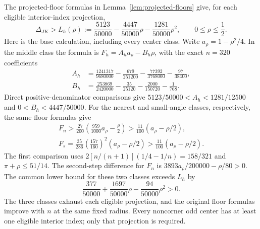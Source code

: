 The projected-floor formulas in Lemma~\ref{lem:projected-floors} give,
for each eligible interior-index projection,
\begin{equation}
 \Delta_{JK}>L_h(\rho):=
 \frac{5123}{50000}-\frac{4447}{50000}\rho
                         -\frac{1281}{50000}\rho^2,
 \qquad 0\leq\rho\leq\frac12.                      \label{eq:argmax-half-floor}
\end{equation}
Here is the base calculation, including every center class.  Write
$a_\rho=1-\rho^2/4$.  In the middle class the formula is
$F_h=A_h a_\rho-B_h\rho$, with the exact $n=320$ coefficients
\begin{align*}
 A_h&=\frac{1241317}{9680000}-\frac{679}{251200}
                    -\frac{77392}{3768000}-\frac{97}{38400},\\
 B_h&=\frac{253869}{2420000}-\frac{35}{25120}
                    -\frac{2000}{150720}-\frac1{768}.
\end{align*}
Direct positive-denominator comparisons give
$5123/50000<A_h<1281/12500$ and $0<B_h<4447/50000$.
For the nearest and small-angle classes, respectively, the same floor
formulas give
\begin{gather*}
 F_n>\frac{27}{200}\left(\frac{959}{1000}a_\rho-\frac\rho2\right)
       >\frac{11}{100}(a_\rho-\rho/2),\\
 F_s=\frac{35}{286}\left(\frac{157}{160}\right)^2(a_\rho-\rho/2)
       >\frac{11}{100}(a_\rho-\rho/2).
\end{gather*}
The first comparison uses
$2[n/(n+1)](1/4-1/n)=158/321$ and
$\pi+\rho\leq51/14$.  The second-step difference for $F_n$ is
$3893a_\rho/200000-\rho/80>0$.  The common lower bound for these
two classes exceeds $L_h$ by
\[
 \frac{377}{50000}+\frac{1697}{50000}\rho
                                    -\frac{94}{50000}\rho^2>0.
\]
The three classes exhaust each eligible projection, and the original
floor formulas improve with $n$ at the same fixed radius.  Every
noncorner odd center has at least one eligible interior index; only
that projection is required.


